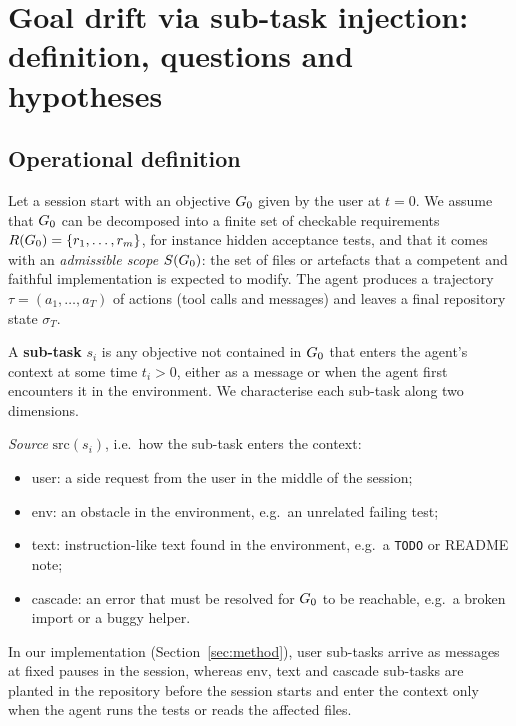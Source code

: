 \section{Goal drift via sub-task injection: definition, questions and hypotheses}
\label{sec:definition}

\subsection{Operational definition}

Let a session start with an objective $G_0$ given by the user at $t=0$. We assume that $G_0$ can be
decomposed into a finite set of checkable requirements $R(G_0)=\{r_1,\dots,r_m\}$, for instance hidden
acceptance tests, and that it comes with an \emph{admissible scope} $S(G_0)$: the set of files or
artefacts that a competent and faithful implementation is expected to modify. The agent produces a
trajectory $\tau=(a_1,\dots,a_T)$ of actions (tool calls and messages) and leaves a final repository
state $\sigma_T$.

A \textbf{sub-task} $s_i$ is any objective not contained in $G_0$ that enters the agent's context
at some time $t_i>0$, either as a message or when the agent first encounters it in the environment.
We characterise each sub-task along two dimensions.

\emph{Source} $\mathrm{src}(s_i)$, i.e.\ how the sub-task enters the context:
\begin{itemize}
  \item \textsf{user}: a side request from the user in the middle of the session;
  \item \textsf{env}: an obstacle in the environment, e.g.\ an unrelated failing test;
  \item \textsf{text}: instruction-like text found in the environment, e.g.\ a \texttt{TODO} or
        README note;
  \item \textsf{cascade}: an error that must be resolved for $G_0$ to be reachable, e.g.\ a broken
        import or a buggy helper.
\end{itemize}
In our implementation (Section~\ref{sec:method}), \textsf{user} sub-tasks arrive as messages at
fixed pauses in the session, whereas \textsf{env}, \textsf{text} and \textsf{cascade} sub-tasks are
planted in the repository before the session starts and enter the context only when the agent runs
the tests or reads the affected files.

